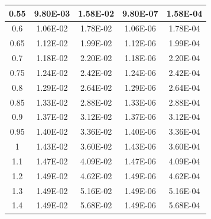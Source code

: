 \documentclass[11pt, a4paper, twocolumn]{article}
\begin{document}
\begin{longtable}[c]{|
>{\columncolor[HTML]{EFEFEF}}c |c|c|c|c|}
0.55               & 9.80E-03                       & 1.58E-02                       & 9.80E-07                   & 1.58E-04                   \\ \hline
0.6                & 1.06E-02                       & 1.78E-02                       & 1.06E-06                   & 1.78E-04                   \\ \hline
0.65               & 1.12E-02                       & 1.99E-02                       & 1.12E-06                   & 1.99E-04                   \\ \hline
0.7                & 1.18E-02                       & 2.20E-02                       & 1.18E-06                   & 2.20E-04                   \\ \hline
0.75               & 1.24E-02                       & 2.42E-02                       & 1.24E-06                   & 2.42E-04                   \\ \hline
0.8                & 1.29E-02                       & 2.64E-02                       & 1.29E-06                   & 2.64E-04                   \\ \hline
0.85               & 1.33E-02                       & 2.88E-02                       & 1.33E-06                   & 2.88E-04                   \\ \hline
0.9                & 1.37E-02                       & 3.12E-02                       & 1.37E-06                   & 3.12E-04                   \\ \hline
0.95               & 1.40E-02                       & 3.36E-02                       & 1.40E-06                   & 3.36E-04                   \\ \hline
1                  & 1.43E-02                       & 3.60E-02                       & 1.43E-06                   & 3.60E-04                   \\ \hline
1.1                & 1.47E-02                       & 4.09E-02                       & 1.47E-06                   & 4.09E-04                   \\ \hline
1.2                & 1.49E-02                       & 4.62E-02                       & 1.49E-06                   & 4.62E-04                   \\ \hline
1.3                & 1.49E-02                       & 5.16E-02                       & 1.49E-06                   & 5.16E-04                   \\ \hline
1.4                & 1.49E-02                       & 5.68E-02                       & 1.49E-06                   & 5.68E-04                   \\ \hline

\end{longtable}
\end{document}
